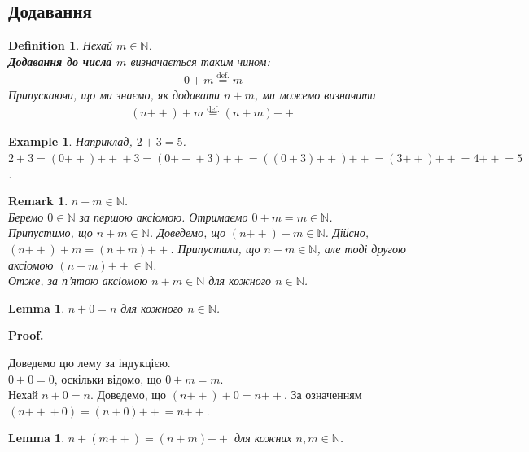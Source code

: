 \documentclass[a4paper, 14pt]{extarticle}
\makeatletter
\theoremstyle{theoremdd}
\theoremstyle{theoremdd}
\newtheorem{definition}[theorem]{Definition}
\theoremstyle{theoremdd}
\theoremstyle{theoremdd}
\theoremstyle{theoremdd}
\theoremstyle{theoremdd}
\newtheorem{example}[theorem]{Example}
\theoremstyle{theoremdd}
\theoremstyle{theoremdd}
\theoremstyle{theoremdd}
\theoremstyle{theoremdd}
\theoremstyle{theoremdd}
\theoremstyle{theoremdd}
\newtheorem{remark}[theorem]{Remark}
\theoremstyle{theoremdd}
\theoremstyle{theoremdd}
\newtheorem{lemma}[theorem]{Lemma}
\theoremstyle{theoremdd}
\theoremstyle{theoremdd}
\renewenvironment{proof}[1][Proof.\\]{\par
\pushQED{\hfill \qed}%
\normalfont \topsep6\p@\@plus6\p@\relax
\trivlist
\item\relax
{\bfseries
#1\@addpunct{.}}\hspace\labelsep\ignorespaces
}{%
\popQED\endtrivlist\@endpefalse
}
\newcommand{\plusplus}{\!\!\mathrel{++}}
\makeatother
\begin{document}
\subsection{Додавання}
\begin{definition}
Нехай $m \in \mathbb{N}$.\\
\textbf{Додавання до числа $m$} визначається таким чином:
\begin{align*}
0 + m \overset{\text{def.}}{=} m
\end{align*}
Припускаючи, що ми знаємо, як додавати $n + m$, ми можемо визначити
\begin{align*}
(n\plusplus) + m \overset{\text{def.}}{=} (n+m)\plusplus
\end{align*}
\end{definition}

\begin{example}
Наприклад, $2 + 3 = 5$.\\
$2 + 3 = (0\plusplus)\plusplus + 3 = (0\plusplus + 3)\plusplus = ((0+3)\plusplus)\plusplus = (3\plusplus)\plusplus = 4\plusplus = 5$.
\end{example}

\begin{remark}
$n+m \in \mathbb{N}$.\\
Беремо $0 \in \mathbb{N}$ за першою аксіомою. Отримаємо $0+m = m \in \mathbb{N}$.\\
Припустимо, що $n+m \in \mathbb{N}$. Доведемо, що $(n\plusplus) + m \in \mathbb{N}$. Дійсно,\\
$(n\plusplus) + m = (n + m)\plusplus$. Припустили, що $n+m \in \mathbb{N}$, але тоді другою аксіомою $(n+m)\plusplus \in \mathbb{N}$.\\
Отже, за п'ятою аксіомою $n+m \in \mathbb{N}$ для кожного $n \in \mathbb{N}$.
\end{remark}

\begin{lemma}
$n + 0 = n$ для кожного $n \in \mathbb{N}$.
\end{lemma}

\begin{proof}
Доведемо цю лему за індукцією.\\
$0 + 0 = 0$, оскільки відомо, що $0+m = m$.\\
Нехай $n + 0 = n$. Доведемо, що $(n \plusplus) + 0 = n\plusplus$. За означенням $(n\plusplus + 0) = (n+0)\plusplus = n \plusplus$.
\end{proof}

\begin{lemma}
$n + (m\plusplus) = (n+m)\plusplus$ для кожних $n,m \in \mathbb{N}$.
\end{lemma}
\end{document}
